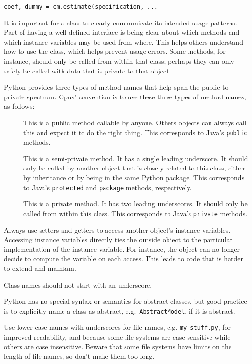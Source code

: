 \begin{verbatim}
coef, dummy = cm.estimate(specification, ... 
\end{verbatim} 

It is important for a class to clearly communicate its intended usage
patterns.  Part of having a well defined interface is being clear about which
methods and which instance variables may be used from where.  This helps others
understand how to use the class, which helps prevent usage errors.  Some
methods, for instance, should only be called from within that class; perhaps
they can only safely be called with data that is private to that object.

Python provides three types of method names that help span the public to
private spectrum.  Opus' convention is to use these three types of method
names, as follows:

\begin{description}
\item[] This is a public method callable by anyone.  Others
objects can always call this and expect it to do the right thing.  This
corresponds to Java's \verb|public| methods.
\item[] This is a semi-private method.  It has a single leading
underscore.  It should only be called by another object that is closely related
to this class, either by inheritance or by being in the same Python package.
This corresponds to Java's \verb|protected| and \verb|package| methods,
respectively.
\item[] This is a private method.  It has two leading
underscores.  It should only be called from within this class.  This
corresponds to Java's \verb|private| methods.
\end{description}

Always use setters and getters to access another object's instance variables.
Accessing instance variables directly ties the outside object to the particular
implementation of the instance variable. For instance, the object can no
longer decide to compute the variable on each access.  This leads to code that
is harder to extend and maintain.

Class names should not start with an underscore.

Python has no special syntax or semantics for abstract classes, but good practice is to
explicitly name a class as abstract, e.g.\ \verb|AbstractModel|, if it is
abstract.

Use lower case names with underscores for file names, e.g.
\verb|my_stuff.py|, for improved readability, and because some
file systems are case sensitive while others are case insensitive.
Beware that some file systems have limits on the length of file
names, so don't make them too long.

